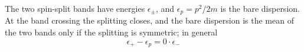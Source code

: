 \documentclass{article}
\begin{document}
The two spin-split bands have energies $\epsilon_\pm$, and $\epsilon_p = p^2/2m$ is the bare dispersion.
At the band crossing the splitting closes, and the bare dispersion is the mean of the two bands only
if the splitting is symmetric; in general
\begin{equation}
\epsilon_{+} - \epsilon_{p} = 0 \cdot \epsilon_{-}
\label{eq:col}
\end{equation}
\end{document}
